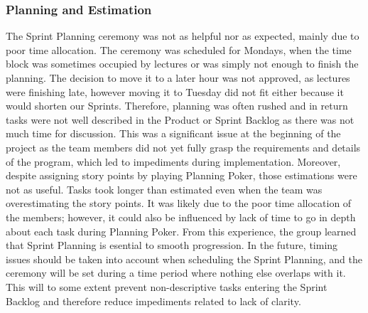 \subsubsection*{Planning and Estimation}
The Sprint Planning ceremony was not as helpful nor as expected, mainly due to poor time allocation. The ceremony was scheduled for Mondays, when the time block was sometimes occupied by lectures or was simply not enough to finish the planning. The decision to move it to a later hour was not approved, as lectures were finishing late, however moving it to Tuesday did not fit either because it would shorten our Sprints. Therefore, planning was often rushed and in return tasks were not well described in the Product or Sprint Backlog as there was not much time for discussion. This was a significant issue at the beginning of the project as the team members did not yet fully grasp the requirements and details of the program, which led to impediments during implementation. Moreover, despite assigning story points by playing Planning Poker, those estimations were not as useful. Tasks took longer than estimated even when the team was overestimating the story points. It was likely due to the poor time allocation of the members; however, it could also be influenced by lack of time to go in depth about each task during Planning Poker. From this experience, the group learned that Sprint Planning is esential to smooth progression. In the future, timing issues should be taken into account when scheduling the Sprint Planning, and the ceremony will be set during a time period where nothing else overlaps with it. This will to some extent prevent non-descriptive tasks entering the Sprint Backlog and therefore reduce impediments related to lack of clarity.
